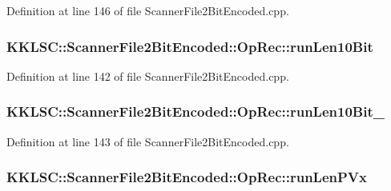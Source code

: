 Definition at line 146 of file Scanner\+File2\+Bit\+Encoded.\+cpp.

\subsubsection[{\texorpdfstring{run\+Len10\+Bit}{runLen10Bit}}]{ K\+K\+L\+S\+C\+::\+Scanner\+File2\+Bit\+Encoded\+::\+Op\+Rec\+::run\+Len10\+Bit}\hypertarget{union_scanner_file2_bit_encoded_1_1_op_rec_adc5282dfa52e325ea8573426cd07e6b4}{}\label{union_scanner_file2_bit_encoded_1_1_op_rec_adc5282dfa52e325ea8573426cd07e6b4}


Definition at line 142 of file Scanner\+File2\+Bit\+Encoded.\+cpp.

\subsubsection[{\texorpdfstring{run\+Len10\+Bit\+\_\+2}{runLen10Bit_2}}]{ K\+K\+L\+S\+C\+::\+Scanner\+File2\+Bit\+Encoded\+::\+Op\+Rec\+::run\+Len10\+Bit\+\_}\hypertarget{union_scanner_file2_bit_encoded_1_1_op_rec_a786d211e6608cbb71bab089f19571d96}{}\label{union_scanner_file2_bit_encoded_1_1_op_rec_a786d211e6608cbb71bab089f19571d96}


Definition at line 143 of file Scanner\+File2\+Bit\+Encoded.\+cpp.

\subsubsection[{\texorpdfstring{run\+Len\+P\+Vx}{runLenPVx}}]{ K\+K\+L\+S\+C\+::\+Scanner\+File2\+Bit\+Encoded\+::\+Op\+Rec\+::run\+Len\+P\+Vx}\hypertarget{union_scanner_file2_bit_encoded_1_1_op_rec_aa483ca17a2220cce31b6221a6d0489e8}{}\label{union_scanner_file2_bit_encoded_1_1_op_rec_aa483ca17a2220cce31b6221a6d0489e8}


